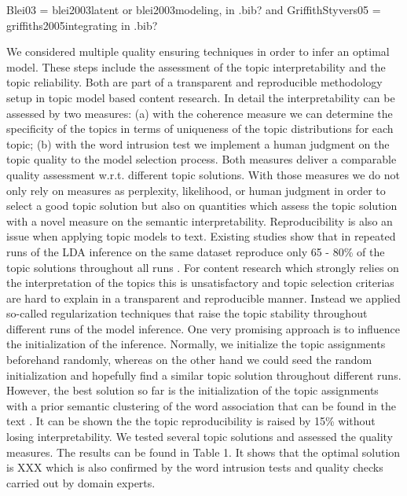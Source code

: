 \documentclass[a4paper,10pt]{article}
\newcommand{\TODO}[1]{\begingroup\color{red}#1\endgroup}
\newcommand{\NR}[1]{\begingroup\color{orange}#1\endgroup}
\begin{document}
  \TODO{Blei03 = blei2003latent or blei2003modeling, in .bib? and GriffithStyvers05
  = griffiths2005integrating in .bib?}


We considered multiple quality ensuring techniques in
order to infer an optimal model. \NR{These} steps include the assessment of the
topic interpretability and the topic reliability. Both are part of a
transparent and reproducible methodology setup in topic model based content
research.  In detail the interpretability can be assessed by two
measures\NR{: (a) w}ith the coherence measure \cite{cohen} we can determine the
specificity of the topics in terms of uniqueness of the topic distributions
for each topic\NR{; (b) w}ith the word intrusion test \cite{Wang} we implement a human
judgment on the topic quality to the model selection process. Both measures
deliver a comparable quality assessment w.r.t. different topic
solutions. With those measures we do not only rely on measures as
perplexity, likelihood, or human judgment in order to select a good topic
solution but also on quantities which assess the topic solution with a novel
measure on the semantic interpretability. Reproducibility is also an issue
when applying topic models to text. Existing studies show that in repeated
runs of the LDA inference on the same dataset reproduce only 65 - 80\% of
the topic solutions throughout all runs \cite{Niekler12,Koltsov14}. For content
research which strongly relies on the interpretation of the topics this is
unsatisfactory and topic selection criterias are hard to explain in a
transparent and reproducible manner. Instead we applied so-called
regularization techniques that
raise the topic stability throughout different runs of the model inference. One  very promising approach is to influence the
initialization of the inference. Normally, we initialize the topic
assignments beforehand randomly, \NR{whereas o}n the other hand we could seed the random
initialization and hopefully find a similar topic solution throughout
different runs. However, the best solution so far is the initialization of
the topic assignments with a prior semantic clustering of the word
association that can be found in the text \cite{Lancichinetti15}. It can be
shown the the topic reproducibility is raised by 15\% without losing
interpretability. We tested several topic solutions and assessed the
quality measures. The results can be found in \TODO{Table 1}. It shows that the
optimal solution is \TODO{XXX} which is also confirmed by the word intrusion tests
and quality checks carried out by domain experts.
\end{document}
